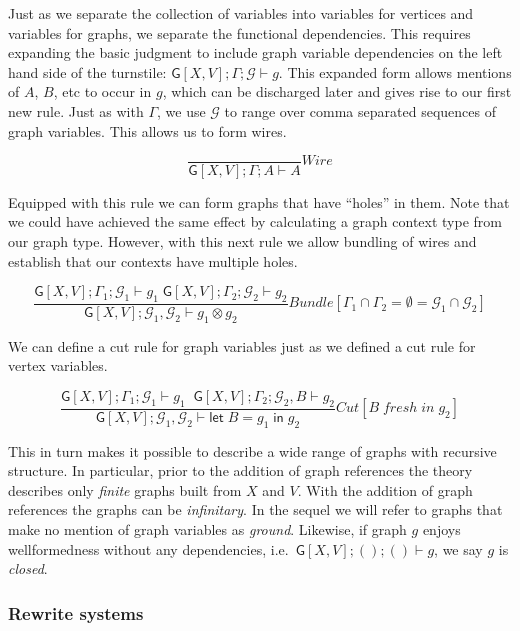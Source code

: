 \documentclass[12pt]{llncs}
\begin{document}
Just as we separate the collection of variables into variables for
vertices and variables for graphs, we separate the functional
dependencies. This requires expanding the basic judgment to include
graph variable dependencies on the left hand side of the turnstile:
\(\mathsf{G}[X,V]; \Gamma; \mathcal{G} \vdash g\). This expanded form
allows mentions of \(A\), \(B\), etc to occur in \(g\), which can be
discharged later and gives rise to our first new rule. Just as with
\(\Gamma\), we use \(\mathcal{G}\) to range over comma separated
sequences of graph variables. This allows us to form wires.

\[\frac{ }{ \mathsf{G}[X,V]; \Gamma; A \vdash A}Wire\]

Equipped with this rule we can form graphs that have ``holes'' in them.
Note that we could have achieved the same effect by calculating a graph
context type from our graph type. However, with this next rule we allow
bundling of wires and establish that our contexts have multiple holes.

\[\frac{ \mathsf{G}[X,V]; \Gamma_1; \mathcal{G}_1 \vdash g_1\; \mathsf{G}[X,V]; \Gamma_2; \mathcal{G}_2 \vdash g_2 }{ \mathsf{G}[X,V]; \mathcal{G}_1, \mathcal{G}_2 \vdash g_1 \otimes g_2 }Bundle [\Gamma_1 \cap \Gamma_2 = \emptyset = \mathcal{G}_1\cap\mathcal{G}_2 ]\]

We can define a cut rule for graph variables just as we defined a cut
rule for vertex variables.

\[\frac{ \mathsf{G}[X,V]; \Gamma_1; \mathcal{G}_1 \vdash g_1 \; \;\mathsf{G}[X,V]; \Gamma_2; \mathcal{G}_2, B \vdash g_2}{ \mathsf{G}[X,V]; \mathcal{G}_{1}, \mathcal{G}_{2} \vdash \mathsf{let}\; B = g_1 \; \mathsf{in}\; g_2}Cut[B\;fresh\; in\; g_{2}]\]

This in turn makes it possible to describe a wide range of graphs with
recursive structure. In particular, prior to the addition of graph
references the theory describes only \emph{finite} graphs built from
\(X\) and \(V\). With the addition of graph references the graphs can be
\emph{infinitary}. In the sequel we will refer to graphs that make no
mention of graph variables as \emph{ground}. Likewise, if graph \(g\)
enjoys wellformedness without any dependencies,
i.e.~\(\mathsf{G}[X,V]; (); () \vdash g\), we say \(g\) is
\emph{closed}.

\hypertarget{rewrite-systems}{%
\subsubsection{Rewrite systems}\label{rewrite-systems}}
\end{document}
